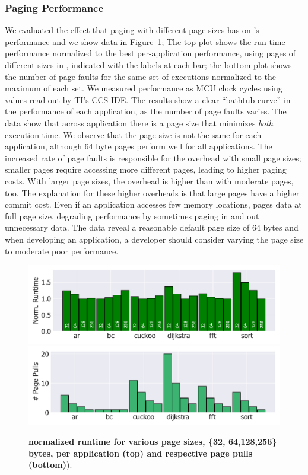 \subsubsection{\sys Paging Performance}
\label{sec:results_memory_management}

We evaluated the effect that paging with different page sizes has on \sys's performance and we show data in Figure~\ref{fig:page_size}; The top plot shows the run time performance normalized to the best per-application performance, using pages of different sizes in \sys, indicated with the labels at each bar; the bottom plot shows the number of page faults for the same set of executions normalized to the maximum of each set. We measured performance as MCU clock cycles using values read out by TI's CCS IDE. The results show a clear ``bathtub curve'' in the performance of each application, as the number of page faults varies. The data show that across application there is a page size that minimizes \emph{both} execution time. We observe that the page size is not the same for each application, although 64 byte pages perform well for all applications. The increased rate of page faults is responsible for the overhead with small page sizes; smaller pages require accessing more different pages, leading to higher paging costs. With larger page sizes, the overhead is higher than with moderate pages, too. The explanation for these higher overheads is that large pages have a higher commit cost. Even if an application accesses few memory locations, \sys pages data at full page size, degrading performance by sometimes paging in and out unnecessary data. The data reveal a reasonable default page size of 64 bytes and when developing an application, a developer should consider varying the page size to moderate poor performance.

\begin{figure}
	\centering
	\includegraphics[width=\columnwidth]{figures/page_exec-time}
	\includegraphics[width=\columnwidth]{figures/pagePulls}
	\caption{\textbf{\sys normalized runtime for various page sizes, \{32, 64,128,256\}\,bytes, per application (top) and respective page pulls (bottom)}).}\vspace{-0.5cm}
	\label{fig:page_size}
\end{figure}

